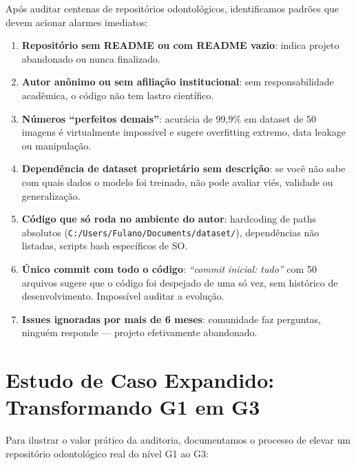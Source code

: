 Após auditar centenas de repositórios odontológicos, identificamos
padrões que devem acionar alarmes imediatos:

\begin{enumerate}
  \item \textbf{Repositório sem README ou com README vazio}: indica
    projeto abandonado ou nunca finalizado.

  \item \textbf{Autor anônimo ou sem afiliação institucional}: sem
    responsabilidade acadêmica, o código não tem lastro científico.

  \item \textbf{Números ``perfeitos demais''}: acurácia de 99,9\% em
    dataset de 50 imagens é virtualmente impossível e sugere overfitting
    extremo, data leakage ou manipulação.

  \item \textbf{Dependência de dataset proprietário sem descrição}:
    se você não sabe com quais dados o modelo foi treinado, não pode
    avaliar viés, validade ou generalização.

  \item \textbf{Código que só roda no ambiente do autor}: hardcoding de
    paths absolutos (\texttt{C:/Users/Fulano/Documents/dataset/}),
    dependências não listadas, scripts bash específicos de SO.

  \item \textbf{Único commit com todo o código}: \textit{``commit inicial:
    tudo''} com 50 arquivos sugere que o código foi despejado de uma só
    vez, sem histórico de desenvolvimento. Impossível auditar a evolução.

  \item \textbf{Issues ignoradas por mais de 6 meses}: comunidade faz
    perguntas, ninguém responde — projeto efetivamente abandonado.
\end{enumerate}


\section{Estudo de Caso Expandido: Transformando G1 em G3}

Para ilustrar o valor prático da auditoria, documentamos o processo de
elevar um repositório odontológico real do nível G1 ao G3:

